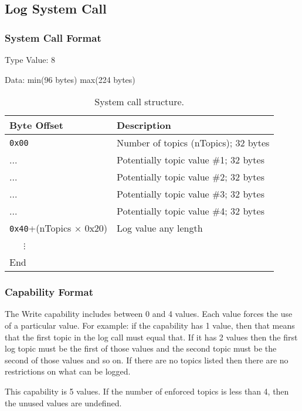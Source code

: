 \documentclass[english,a4paper]{article}
\let\oldparagraph\subsubsection
\renewcommand{\subsubsection}[1]{\oldparagraph{#1}\mbox{}}
\begin{document}
\subsection{Log System Call}

\subsubsection{System Call Format}
Type Value: 8

Data: min(96 bytes) max(224 bytes)

\begin{table}[H]
  \caption{System call structure.}
  \centering{}%
  \begin{tabularx}{\textwidth}{l|X}
    \hline
    Byte Offset & Description \\
    \hline
    \hline
    \texttt{0x00} & Number of topics (nTopics); 32 bytes \\
    ... & Potentially topic value \#1; 32 bytes \\
    ... & Potentially topic value \#2; 32 bytes \\
    ... & Potentially topic value \#3; 32 bytes \\
    ... & Potentially topic value \#4; 32 bytes \\
    \texttt{0x40}+(nTopics $\times$ 0x20) & Log value any length \\
    ~~~$\vdots$ & \\
    \hline
    End &  \\
    \hline
  \end{tabularx}
\end{table}

\subsubsection{Capability Format}
The Write capability includes between 0 and 4 values. Each value forces the use
of a particular value. For example: if the capability has 1 value, then that
means that the first topic in the log call must equal that. If it has 2 values
then the first log topic must be the first of those values and the second topic
must be the second of those values and so on. If there are no topics listed then
there are no restrictions on what can be logged.

This capability is 5 values. If the number of enforced topics is less than 4,
then the unused values are undefined.
\end{document}
